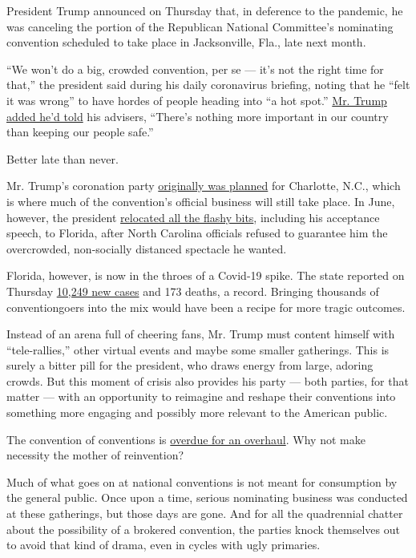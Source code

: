 President Trump announced on Thursday that, in deference to the
pandemic, he was canceling the portion of the Republican National
Committee's nominating convention scheduled to take place in
Jacksonville, Fla., late next month.

``We won't do a big, crowded convention, per se --- it's not the right
time for that,'' the president said during his daily coronavirus
briefing, noting that he ``felt it was wrong'' to have hordes of people
heading into ``a hot spot.''
\href{https://www.nytimes.com/2020/07/23/us/politics/jacksonville-rnc.html}{Mr.
Trump added he'd told} his advisers, ``There's nothing more important in
our country than keeping our people safe.''

Better late than never.

Mr. Trump's coronation party
\href{https://www.nytimes.com/2020/06/06/us/politics/republican-convention-charlotte-2020.html}{originally
was planned} for Charlotte, N.C., which is where much of the
convention's official business will still take place. In June, however,
the president
\href{https://www.nytimes.com/2020/06/11/us/politics/trump-jacksonville-rnc-speech.html}{relocated
all the flashy bits}, including his acceptance speech, to Florida, after
North Carolina officials refused to guarantee him the overcrowded,
non-socially distanced spectacle he wanted.

Florida, however, is now in the throes of a Covid-19 spike. The state
reported on Thursday \href{https://floridahealthcovid19.gov/}{10,249 new
cases} and 173 deaths, a record. Bringing thousands of conventiongoers
into the mix would have been a recipe for more tragic outcomes.

Instead of an arena full of cheering fans, Mr. Trump must content
himself with ``tele-rallies,'' other virtual events and maybe some
smaller gatherings. This is surely a bitter pill for the president, who
draws energy from large, adoring crowds. But this moment of crisis also
provides his party --- both parties, for that matter --- with an
opportunity to reimagine and reshape their conventions into something
more engaging and possibly more relevant to the American public.

The convention of conventions is
\href{https://www.nytimes.com/2020/05/04/us/politics/democratic-republican-convention.html}{overdue
for an overhaul}. Why not make necessity the mother of reinvention?

Much of what goes on at national conventions is not meant for
consumption by the general public. Once upon a time, serious nominating
business was conducted at these gatherings, but those days are gone. And
for all the quadrennial chatter about the possibility of a brokered
convention, the parties knock themselves out to avoid that kind of
drama, even in cycles with ugly primaries.

